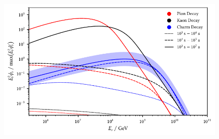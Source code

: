 \begin{figure}[H]
	\centering
	\includegraphics{../plots/build/magnetar_integrated_neutrino_spectrum_without.pdf}
	\caption[Magnetar $\nu \kern+0.5pt$ fluence compared to $c$ decay without optical depth.]
			{}
	\label{fig:magnetar-fluence-without}
\end{figure}
